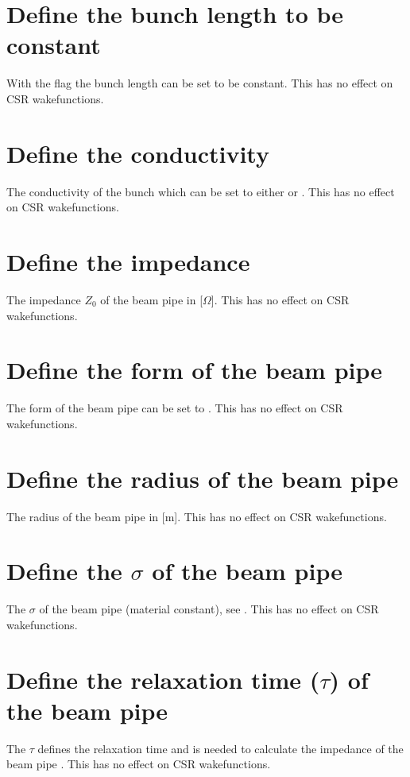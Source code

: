 \section{Define the bunch length to be constant}
\label{sec:CONSTLEN}
With the  flag the bunch length can be set to be constant. This has no effect on CSR wakefunctions.

\section{Define the conductivity}
\label{sec:CONDUCT}
The conductivity of the bunch which can be set to either  or . This has no effect on CSR wakefunctions.

\section{Define the impedance}
\label{sec:Z}
The impedance $Z_0$ of the beam pipe in [$\Omega$]. This has no effect on CSR wakefunctions.

\section{Define the form of the beam pipe}
\label{sec:FORM}
The form of the beam pipe can be set to . This has no effect on CSR wakefunctions.

\section{Define the radius of the beam pipe}
\label{sec:RADIUS}
The radius of the beam pipe in [m]. This has no effect on CSR wakefunctions.

\section{Define the $\sigma$ of the beam pipe}
\label{sec:SIGMA}
The $\sigma$ of the beam pipe (material constant), see . This has no effect on CSR wakefunctions.

\section{Define the relaxation time ($\tau$) of the beam pipe}
\label{sec:TAU}
The $\tau$ defines the relaxation time and is needed to calculate the impedance of the beam pipe . This has no effect on CSR wakefunctions.

